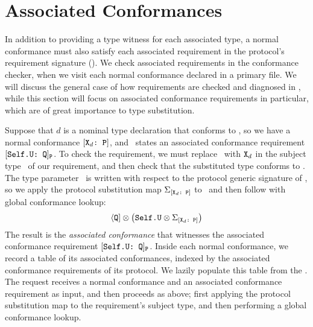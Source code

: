 \documentclass[../generics]{subfiles}
\begin{document}
\section{Associated Conformances}\label{associated conformances}

In addition to providing a type witness for each associated type, a normal conformance must also satisfy each associated requirement in the protocol's requirement signature (). We check associated requirements in the conformance checker, when we visit each normal conformance declared in a primary file. We will discuss the general case of how requirements are checked and diagnosed in , while this section will focus on associated conformance requirements in particular, which are of great importance to type substitution.

Suppose that $d$ is a nominal type declaration that conforms to \tP, so we have a normal conformance $[\texttt{$\texttt{X}_d$:~P}]$, and \tP\ states an associated conformance requirement $[\texttt{Self.U:~Q}]_{\texttt{P}}$. To check the requirement, we must replace \IndexSelf\tSelf\ with $\texttt{X}_d$ in the subject type \SelfU\ of our requirement, and then check that the substituted type conforms to \tQ. The type parameter \SelfU\ is written with respect to the protocol generic signature of \tP, so we apply the protocol substitution map $\Sigma_{[\texttt{$\texttt{X}_d$:~P}]}$ to \SelfU\ and then follow with global conformance lookup:
\[
\langle\texttt{Q}] \otimes \big(\texttt{Self.U} \otimes \Sigma_{[\texttt{$\texttt{X}_d$:~P}]}\big)
\]
The result is the \emph{associated conformance} that witnesses the associated conformance requirement $[\texttt{Self.U:~Q}]_{\texttt{P}}$. Inside each normal conformance, we record a table of its associated conformances, indexed by the associated conformance requirements of its protocol. We lazily populate this table from the . The request receives a normal conformance and an associated conformance requirement as input, and then proceeds as above; first applying the protocol substitution map to the requirement's subject type, and then performing a global conformance lookup.
\end{document}

